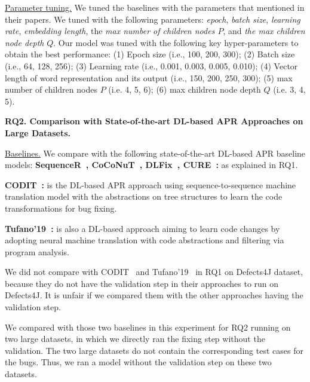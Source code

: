 \underline{Parameter tuning.} We tuned the baselines with the
parameters that mentioned in their papers. We tuned \tool with the
following parameters: {\em epoch}, {\em batch size}, {\em learning
  rate}, {\em embedding length}, the {\em max number of children nodes
  $P$}, and {\em the max children node depth} $Q$. Our model was tuned with the following key
hyper-parameters to obtain the best performance: (1) Epoch size (i.e.,
100, 200, 300); (2) Batch size (i.e., 64, 128, 256); (3) Learning rate
(i.e., 0.001, 0.003, 0.005, 0.010); (4) Vector length of word
representation and its output (i.e., 150, 200, 250, 300); (5) max number of children nodes
$P$ (i.e. 4, 5, 6); (6) max children node depth $Q$ (i.e. 3, 4, 5).

{\bf RQ2. Comparison with State-of-the-art DL-based APR Approaches on
  Large Datasets.}

\underline{Baselines.} We compare {\tool} with the following
state-of-the-art DL-based APR baseline models: {\bf
  SequenceR~\cite{chen2018sequencer},
  CoCoNuT~\cite{lutellier2020coconut}, DLFix~\cite{icse20},
  CURE~\cite{cure-icse21}:} as explained in RQ1.

{\bf CODIT~\cite{chakrabortycodit}:} is the DL-based APR approach using
sequence-to-sequence machine translation model with the abstractions on tree
structures to learn the code transformations for bug fixing.

{\bf Tufano'19~\cite{tufano2019learning}:} is also a DL-based approach
aiming to learn code changes by adopting neural machine translation
with code abstractions and filtering via program analysis.

We did not compare with CODIT~\cite{chakrabortycodit} and
Tufano'19~\cite{tufano2019learning} in RQ1 on Defects4J dataset,
because they do not have the validation step in their approaches to
run on Defects4J. It is unfair if we compared them with the other
approaches having the validation step.

We compared {\tool} with those two baselines in this experiment for
RQ2 running on two large datasets, in which we directly ran the fixing
step without the validation. The two large datasets do not contain the
corresponding test cases for the bugs. Thus, we ran a model
without the validation step on these two datasets.


